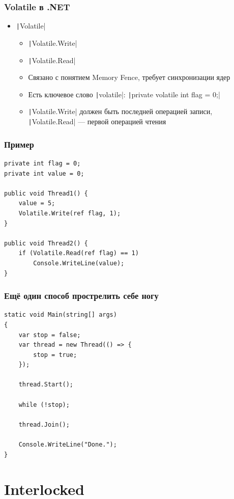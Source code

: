 \documentclass[xetex,mathserif,serif]{beamer}
\begin{document}
    \begin{frame}
        \frametitle{Volatile в .NET}
        \begin{itemize}
            \item \texttt|Volatile|
            \begin{itemize}
                \item \texttt|Volatile.Write|
                \item \texttt|Volatile.Read|
                \item Связано с понятием Memory Fence, требует синхронизации ядер
                \item Есть ключевое слово \texttt|volatile|: \texttt|private volatile int flag = 0;|
                \item \texttt|Volatile.Write| должен быть последней операцией записи, \texttt|Volatile.Read| --- первой операцией чтения
            \end{itemize}
        \end{itemize}
    \end{frame}

    \begin{frame}[fragile]
        \frametitle{Пример}
        \begin{verbatim}
private int flag = 0;
private int value = 0;

public void Thread1() {
    value = 5;
    Volatile.Write(ref flag, 1);
}

public void Thread2() {
    if (Volatile.Read(ref flag) == 1)
        Console.WriteLine(value);
}
        \end{verbatim}
    \end{frame}

    \begin{frame}[fragile]
        \frametitle{Ещё один способ прострелить себе ногу}
        \begin{verbatim}
static void Main(string[] args)
{
    var stop = false;
    var thread = new Thread(() => {
        stop = true;
    });

    thread.Start();

    while (!stop);

    thread.Join();

    Console.WriteLine("Done.");
}
        \end{verbatim}
    \end{frame}

    \section{Interlocked}
\end{document}
